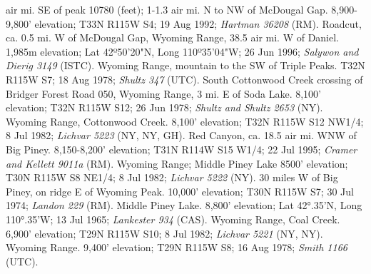 air mi. SE of peak 10780 (feet); 1-1.3 air mi. N to NW of McDougal Gap.
8,900-9,800' elevation; T33N R115W S4; 19 Aug 1992; \textit{Hartman 36208} (RM).
Roadcut, ca. 0.5 mi. W of McDougal Gap, Wyoming Range, 38.5 air mi. W of Daniel.
1,985m elevation; Lat 42º50'20"N, Long 110º35'04"W; 26 Jun 1996;
\textit{Salywon and Dierig 3149} (ISTC).
Wyoming Range, mountain to the SW of Triple Peaks. T32N R115W S7; 18 Aug 1978;
\textit{Shultz 347} (UTC).
South Cottonwood Creek crossing of Bridger Forest Road 050, Wyoming Range,
3 mi. E of Soda Lake. 8,100' elevation; T32N R115W S12; 26 Jun 1978;
\textit{Shultz and Shultz 2653} (NY).
Wyoming Range, Cottonwood Creek. 8,100' elevation; T32N R115W S12 NW1/4;
8 Jul 1982; \textit{Lichvar 5223} (NY, NY, GH).
Red Canyon, ca. 18.5 air mi. WNW of Big Piney. 8,150-8,200' elevation;
T31N R114W S15 W1/4; 22 Jul 1995; \textit{Cramer and Kellett 9011a} (RM).
Wyoming Range; Middle Piney Lake 8500' elevation; T30N R115W S8 NE1/4;
8 Jul 1982; \textit{Lichvar 5222} (NY).
30 miles W of Big Piney, on ridge E of Wyoming Peak. 10,000' elevation;
T30N R115W S7; 30 Jul 1974; \textit{Landon 229} (RM).
Middle Piney Lake. 8,800' elevation; Lat 42°.35'N, Long 110°.35’W; 13 Jul 1965;
\textit{Lankester 934} (CAS).
Wyoming Range, Coal Creek. 6,900' elevation; T29N R115W S10; 8 Jul 1982;
\textit{Lichvar 5221} (NY, NY).
Wyoming Range. 9,400' elevation; T29N R115W S8; 16 Aug 1978;
\textit{Smith 1166} (UTC).

